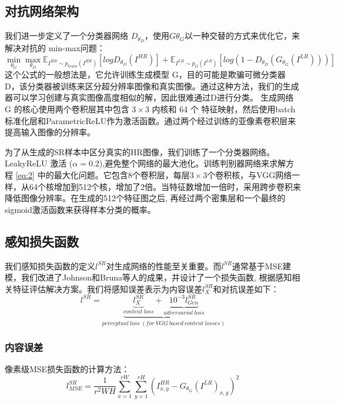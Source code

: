 \documentclass[UTF8,a4paper,10pt]{ctexrep}
\begin{document}
\subsection{对抗网络架构}
我们进一步定义了一个分类器网络 $D_{\theta_D}$，使用$G{\theta_G}$以一种交替的方式来优化它，来解决对抗的 min-max问题：
\begin{equation}
  \mathop{min}\limits_{\theta_G} \mathop{max}\limits_{\theta_D} \mathbb{E}_{I^{HR} \sim p_{train}(I^{HR})}[logD_{\theta_D}(I^{HR})] + \mathbb{E}_{I^{LR} \sim p_G(I^{LR})}[log(1 - D_{\theta_D}(G_{\theta_G}(I^{LR})))]\label{eq:2}
\end{equation}
这个公式的一般想法是，它允许训练生成模型 G，目的可能是欺骗可微分类器 D，该分类器被训练来区分超分辨率图像和真实图像。通过这种方法，我们的生成器可以学习创建与真实图像高度相似的解，因此很难通过D进行分类。
生成网络 G 的核心使用两个卷积层其中包含 $3 × 3$ 内核和 64 个 特征映射，然后使用batch标准化层和ParametricReLU作为激活函数。通过两个经过训练的亚像素卷积层来提高输入图像的分辨率。

为了从生成的SR样本中区分真实的HR图像，我们训练了一个分类器网络。LeakyReLU 激活 ($\alpha = 0.2$),避免整个网络的最大池化。训练判别器网络来求解方程 \ref{eq:2} 中的最大化问题。它包含8个卷积层，每层$3 × 3$个卷积核，与VGG网络一样，从64个核增加到512个核，增加了2倍。当特征数增加一倍时，采用跨步卷积来降低图像分辨率。在生成的512个特征图之后, 再经过两个密集层和一个最终的sigmoid激活函数来获得样本分类的概率。

\subsection{感知损失函数}
我们感知损失函数的定义$l^{SR}$对生成网络的性能至关重要。而$l^{SR}$通常基于MSE建模，我们改进了Johnson和Bruna等人的成果，并设计了一个损失函数, 根据感知相关特征评估解决方案。我们将感知误差表示为内容误差$l_X^{SR}$和对抗误差如下：
\begin{equation}
  l^{SR} = \underbrace{\underbrace{l_X^{SR}}_{content\ loss} + \underbrace{10^{-3} l_{Gen}^{SR}}_{adversarial\ loss}}_{perceptual\ loss\ (for\ VGG\ based\ content\ losses)}\label{eq:3}
\end{equation}

\subsubsection{内容误差}
像素级MSE损失函数的计算方法：
\begin{equation}
  l_{MSE}^{SR} = \frac{1}{r^2WH}\sum_{x = 1}^{rW}\sum_{y = 1}^{rH}(I_{x, y}^{HR} - G_{\theta_G}(I^{LR})_{x, y})^2\label{eq:4}
\end{equation}
\end{document}

